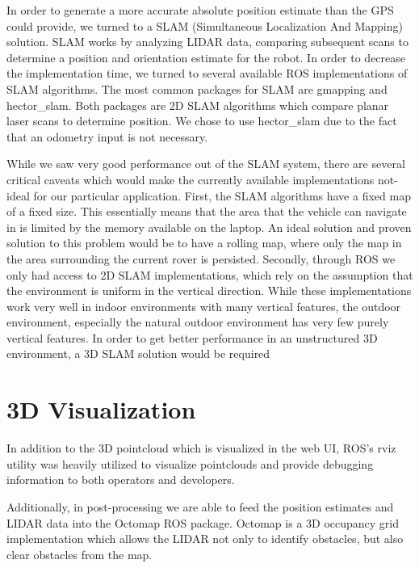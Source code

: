 
In order to generate a more accurate absolute position estimate than the GPS could provide, we turned to a SLAM (Simultaneous Localization And Mapping) solution. SLAM works by analyzing LIDAR data, comparing subsequent scans to determine a position and orientation estimate for the robot. In order to decrease the implementation time, we turned to several available ROS implementations of SLAM algorithms. The most common packages for SLAM are gmapping and hector\_slam. Both packages are 2D SLAM algorithms which compare planar laser scans to determine position. We chose to use hector\_slam due to the fact that an odometry input is not necessary.  

While we saw very good performance out of the SLAM system, there are several critical caveats which would make the currently available implementations not-ideal for our particular application. First, the SLAM algorithms have a fixed map of a fixed size. This essentially means that the area that the vehicle can navigate in is limited by the memory available on the laptop. An ideal solution and proven solution to this problem would be to have a rolling map, where only the map in the area surrounding the current rover is persisted. Secondly, through ROS we only had access to 2D SLAM implementations, which rely on the assumption that the environment is uniform in the vertical direction. While these implementations work very well in indoor environments with many vertical features, the outdoor environment, especially the natural outdoor environment has very few purely vertical features. In order to get better performance in an unstructured 3D environment, a 3D SLAM solution would be required

\section{3D Visualization}


In addition to the 3D pointcloud which is visualized in the web UI, ROS's rviz utility was heavily utilized to visualize pointclouds and provide debugging information to both operators and developers. 


Additionally, in post-processing we are able to feed the position estimates and LIDAR data into the Octomap ROS package. Octomap is a 3D occupancy grid implementation which allows the LIDAR not only to identify obstacles, but also clear obstacles from the map.

